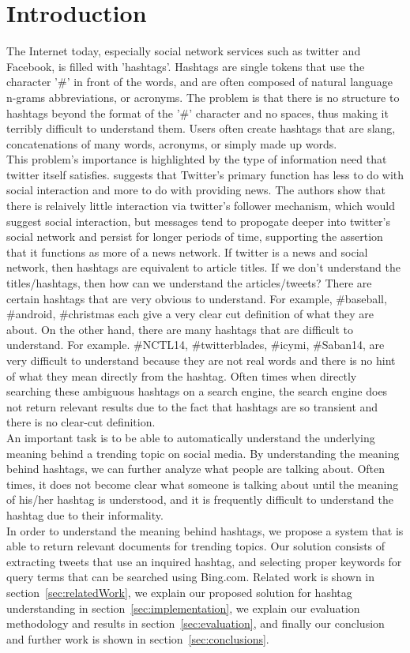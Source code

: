 \documentclass{sig-alternate}
\begin{document}
\section{Introduction}
The Internet today, especially social network services such as twitter and Facebook, is filled with 'hashtags'. Hashtags are single tokens that use the character '\#' in front of the words, and are often composed of natural language n-grams abbreviations, or acronyms. The problem is that there is no structure to hashtags beyond the format of the '\#' character and no spaces, thus making it terribly difficult to understand them. Users often create hashtags that are slang, concatenations of many words, acronyms, or simply made up words.  \\
This problem's importance is highlighted by the type of information need that twitter itself satisfies.  \cite{twitternews} suggests that Twitter's primary function has less to do with social interaction and more to do with providing news.  The authors show that there is relaively little interaction via twitter's follower mechanism, which would suggest social interaction, but messages tend to propogate deeper into twitter's social network and persist for longer periods of time, supporting the assertion that it functions as more of a news network.  If twitter is a news and social network, then hashtags are equivalent to article titles.  If we don't understand the titles/hashtags, then how can we understand the articles/tweets?
There are certain hashtags that are very obvious to understand. For example, \#baseball, \#android, \#christmas each give a very clear cut definition of what they are about. On the other hand, there are many hashtags that are difficult to understand. For example. \#NCTL14, \#twitterblades, \#icymi, \#Saban14, are very difficult to understand because they are not real words and there is no hint of what they mean directly from the hashtag. Often times when directly searching these ambiguous hashtags on a search engine, the search engine does not return relevant results due to the fact that hashtags are so transient and there is no clear-cut definition.\\
An important task is to be able to automatically understand the underlying meaning behind a trending topic on social media. By understanding the meaning behind hashtags, we can further analyze what people are talking about. Often times, it does not become clear what someone is talking about until the meaning of his/her hashtag is understood, and it is frequently difficult to understand the hashtag due to their informality.\\
In order to understand the meaning behind hashtags, we propose a system that is able to return relevant documents for trending topics. Our solution consists of extracting tweets that use an inquired hashtag, and selecting proper keywords for query terms that can be searched using Bing.com. Related work is shown in section~\ref{sec:relatedWork}, we explain our proposed solution for hashtag understanding in  section~\ref{sec:implementation}, we explain our evaluation methodology and results in section~\ref{sec:evaluation}, and finally our conclusion and further work is shown in section~\ref{sec:conclusions}.
\\
\end{document}
